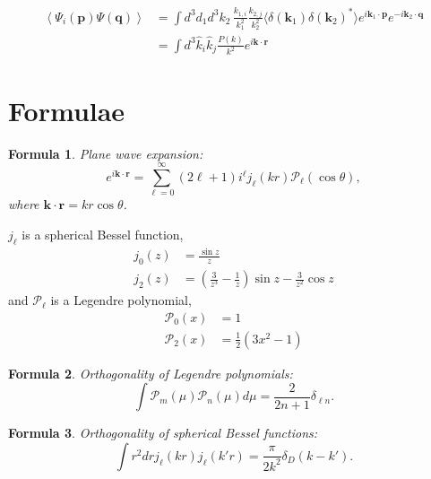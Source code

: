 \documentclass[a4paper,11pt]{article}
\newtheorem{formula}{Formula}[section]
\begin{document}
\begin{align}
  \left\langle \Psi_i(\bm{p}) \Psi(\bm{q}) \right\rangle
  &= \int d^3 d_1 d^3 k_2 \, \frac{k_{1, i}}{k_1^2} \frac{k_{2,j}}{k_2^2}
     \langle \delta(\bm{k}_1) \delta(\bm{k}_2)^* \rangle e^{i\bm{k}_1 \cdot \bm{p}}
     e^{-i\bm{k}_2 \cdot \bm{q}}\\
  &= \int \! d^3 \hat{k}_i \hat{k}_j \frac{P(k)}{k^2} e^{i\bm{k}\cdot \bm{r}} 
\end{align}

\appendix

\section{Formulae}

\begin{formula}
  Plane wave expansion:
  \begin{equation}
    e^{i\bm{k} \cdot \bm{r}} = \sum_{\ell=0}^\infty (2 \ell + 1) i^\ell j_\ell(kr) \mathcal{P}_\ell (\cos \theta),
  \end{equation}
where $\bm{k} \cdot \bm{r} = k r \cos\theta$.
\end{formula}

$j_\ell$ is a spherical Bessel function,
\begin{align}
  j_0(z) &= \frac{\sin z}{z}\\
  j_2(z) &= \left( \frac{3}{z^3} - \frac{1}{z} \right) \sin z
            - \frac{3}{z^2} \cos z
\end{align}
and $\mathcal{P}_\ell$ is a Legendre polynomial,
\begin{align}
  \mathcal{P}_0(x) &= 1\\
  \mathcal{P}_2(x) &= \frac{1}{2} (3 x^2 - 1)
\end{align}

\begin{formula}
  Orthogonality of Legendre polynomials:
  \begin{equation}
    \int \mathcal{P}_m(\mu) \mathcal{P}_n(\mu) d\mu =
    \frac{2}{2 n + 1} \delta_{\ell n}.
  \end{equation}
\end{formula}

\begin{formula}
  Orthogonality of spherical Bessel functions:
  \begin{equation}
    \int \! r^2 dr j_\ell(kr) j_\ell(k'r)
    = \frac{\pi}{2k^2} \delta_D(k - k').
  \end{equation}
\end{formula}
\end{document}
